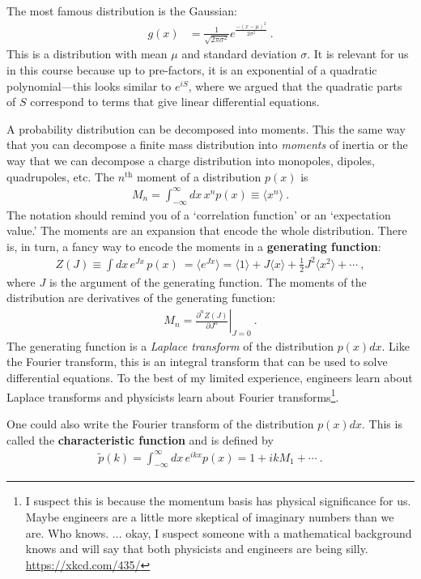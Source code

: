 \begin{example}
The most famous distribution is the Gaussian:
\begin{align}
	g(x) &= \frac{1}{\sqrt{2\pi \sigma^2}} e^{\frac{-(x-\mu)^2}{2\sigma^2}} \ .
\end{align}
This is a distribution with mean $\mu$ and standard deviation $\sigma$. It is relevant for us in this course because up to pre-factors, it is an exponential of a quadratic polynomial---this looks similar to $e^{iS}$, where we argued that the quadratic parts of $S$ correspond to terms that give linear differential equations.
\end{example}

A probability distribution can be decomposed into moments. This the same way that you can decompose a finite mass distribution into \emph{moments} of inertia or the way that we can decompose a charge distribution into monopoles, dipoles, quadrupoles, etc. The $n^\text{th}$ moment of a distribution $p(x)$ is
\begin{align}
	M_n = \int_{-\infty}^\infty dx \, x^n p(x) \equiv \langle x^n \rangle \ .
\end{align}
The notation should remind you of a `correlation function' or an `expectation value.' The moments are an expansion that encode the whole distribution. There is, in turn, a fancy way to encode the moments in a \textbf{generating function}:
\begin{align}
	Z(J) \equiv \int dx\, e^{J x} \, p(x) \  
	= \langle e^{J x}\rangle
	= \langle 1 \rangle + J \langle x\rangle
	+ \frac{1}{2}J^2 \langle x^2\rangle + \cdots \ ,
	\label{eq:generating:function}
\end{align}
where $J$ is the argument of the generating function. The moments of the distribution are derivatives of the generating function:
\begin{align}
	M_n =
	\left.\frac{\partial^n Z(J)}{\partial J^n}\right|_{J = 0} \ .
\end{align}
The generating function is a \emph{Laplace transform} of the distribution $p(x)dx$. Like the Fourier transform, this is an integral transform that can be used to solve differential equations. To the best of my limited experience, engineers learn about Laplace transforms and physicists learn about Fourier transforms\footnote{I suspect this is because the momentum basis has physical significance for us. Maybe engineers are a little more skeptical of imaginary numbers than we are. Who knows. ... okay, I suspect someone with a mathematical background knows and will say that both physicists and engineers are being silly. \url{https://xkcd.com/435/}}.
\begin{example}
One could also write the Fourier transform of the distribution $p(x)dx$. This is called the \textbf{characteristic function} and is defined by
\begin{align}
	\tilde p(k) = \int_{-\infty}^\infty dx\, e^{ikx}p(x) = 1 + ikM_1 + \cdots \ .
\end{align}
\end{example}

